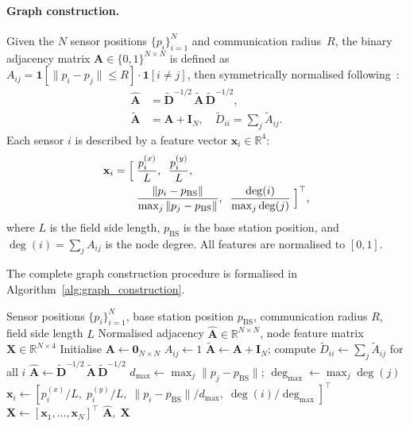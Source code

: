 \paragraph{Graph construction.}
Given the $N$ sensor positions $\{p_i\}_{i=1}^N$ and communication radius~$R$, the binary adjacency matrix $\mathbf{A} \in \{0,1\}^{N \times N}$ is defined as $A_{ij} = \mathbf{1}[\|p_i - p_j\| \leq R] \cdot \mathbf{1}[i \neq j]$, then symmetrically normalised following~\cite{kipf2017semi}:
\begin{align}
    \hat{\mathbf{A}} &= \tilde{\mathbf{D}}^{-1/2}\,\tilde{\mathbf{A}}\,\tilde{\mathbf{D}}^{-1/2}, \nonumber\\
    \tilde{\mathbf{A}} &= \mathbf{A} + \mathbf{I}_N, \quad \tilde{D}_{ii} = \textstyle\sum_j \tilde{A}_{ij}.
    \label{eq:norm_adj}
\end{align}
Each sensor $i$ is described by a feature vector $\mathbf{x}_i \in \mathbb{R}^4$:
\begin{align}
    \mathbf{x}_i = \Bigl[\; &\frac{p_i^{(x)}}{L},\;\; \frac{p_i^{(y)}}{L},\nonumber\\
    &\frac{\|p_i - p_{\text{BS}}\|}{\max_j \|p_j - p_{\text{BS}}\|},\;\; \frac{\deg(i)}{\max_j \deg(j)} \;\Bigr]^\top,
    \label{eq:node_features}
\end{align}
where $L$ is the field side length, $p_{\text{BS}}$ is the base station position, and $\deg(i) = \sum_j A_{ij}$ is the node degree. All features are normalised to $[0, 1]$.

The complete graph construction procedure is formalised in Algorithm~\ref{alg:graph_construction}.

\begin{algorithm}[H]
\caption{Graph Construction --- Pseudocode}
\label{alg:graph_construction}
\begin{algorithmic}[1]
\REQUIRE Sensor positions $\{p_i\}_{i=1}^N$, base station position $p_{\text{BS}}$, communication radius $R$, field side length $L$
\ENSURE Normalised adjacency $\hat{\mathbf{A}} \in \mathbb{R}^{N \times N}$, node feature matrix $\mathbf{X} \in \mathbb{R}^{N \times 4}$
\STATE Initialise $\mathbf{A} \leftarrow \mathbf{0}_{N \times N}$ 
    \STATE $A_{ij} \leftarrow 1$
\ENDFOR
\STATE $\tilde{\mathbf{A}} \leftarrow \mathbf{A} + \mathbf{I}_N$; compute $\tilde{D}_{ii} \leftarrow \sum_j \tilde{A}_{ij}$ for all $i$ 
\STATE $\hat{\mathbf{A}} \leftarrow \tilde{\mathbf{D}}^{-1/2}\,\tilde{\mathbf{A}}\,\tilde{\mathbf{D}}^{-1/2}$ 
\STATE $d_{\max} \leftarrow \max_j \|p_j - p_{\text{BS}}\|$; \quad $\deg_{\max} \leftarrow \max_j \deg(j)$
    \STATE $\mathbf{x}_i \leftarrow [p_i^{(x)}/L,\; p_i^{(y)}/L,\; \|p_i - p_{\text{BS}}\|/d_{\max},\; \deg(i)/\deg_{\max}]^\top$ 
\ENDFOR
\STATE $\mathbf{X} \leftarrow [\mathbf{x}_1, \ldots, \mathbf{x}_N]^\top$
\RETURN $\hat{\mathbf{A}},\; \mathbf{X}$
\end{algorithmic}
\end{algorithm}

